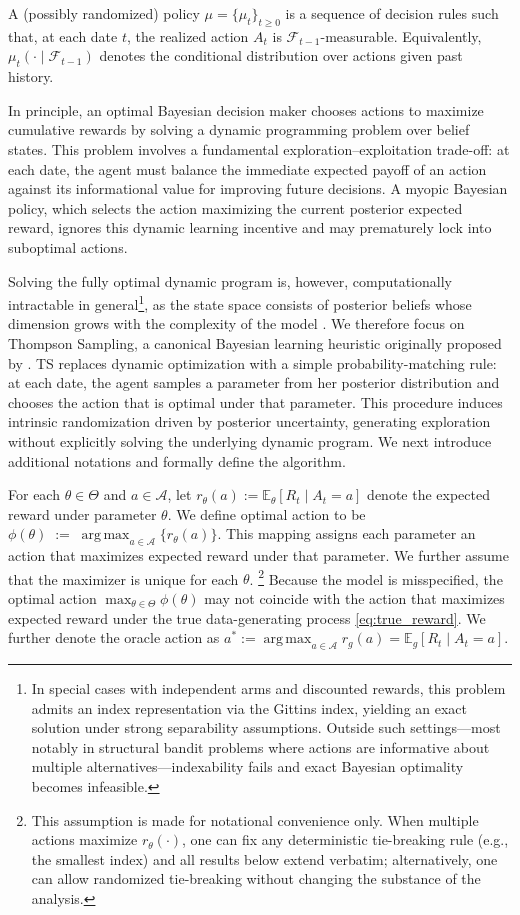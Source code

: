 \documentclass[12pt]{article}
\DeclareMathOperator*{\argmax}{arg\,max}
\begin{document}
A (possibly randomized) policy $\mu=\{\mu_t\}_{t\ge 0}$ is a sequence of decision rules such that, at each date $t$, the realized action $A_t$ is $\mathcal F_{t-1}$-measurable. Equivalently, $\mu_t(\cdot\mid\mathcal F_{t-1})$ denotes the conditional distribution over actions given past history. 

In principle, an optimal Bayesian decision maker chooses actions to maximize cumulative rewards by solving a dynamic programming problem over belief states. This problem involves a fundamental exploration–exploitation trade-off: at each date, the agent must balance the immediate expected payoff of an action against its informational value for improving future decisions. A myopic Bayesian policy, which selects the action maximizing the current posterior expected reward, ignores this dynamic learning incentive and may prematurely lock into suboptimal actions.

Solving the fully optimal dynamic program is, however, computationally intractable in general\footnote{In special cases with independent arms and discounted rewards, this problem admits an index representation via the Gittins index, yielding an exact solution under strong separability assumptions. Outside such settings—most notably in structural bandit problems where actions are informative about multiple alternatives—indexability fails and exact Bayesian optimality becomes infeasible.}, as the state space consists of posterior beliefs whose dimension grows with the complexity of the model \citep{lattimoreBanditAlgorithms2020}. We therefore focus on Thompson Sampling, a canonical Bayesian learning heuristic originally proposed by \citet{thompsonLikelihoodThatOne1933}. TS replaces dynamic optimization with a simple probability-matching rule: at each date, the agent samples a parameter from her posterior distribution and chooses the action that is optimal under that parameter. This procedure induces intrinsic randomization driven by posterior uncertainty, generating exploration without explicitly solving the underlying dynamic program. We next introduce additional notations and formally define the algorithm.

For each $\theta \in \Theta$ and $a \in \mathcal{A}$, let $
r_\theta(a) := \mathbb E_\theta[R_t \mid A_t = a]
$ denote the expected reward under parameter $\theta$. We define optimal action to be $\label{eq:optimal_action} \phi(\theta) \;:=\; \argmax_{a \in \mathcal{A}} \{ r_{\theta}(a) \}$. This mapping assigns each parameter an action that maximizes expected reward under that parameter. We further assume that the maximizer is unique for each $\theta$. \footnote{This assumption is made for notational convenience only. When multiple actions maximize $r_\theta(\cdot)$, one can fix any deterministic tie-breaking rule (e.g., the smallest index) and all results below extend verbatim; alternatively, one can allow randomized tie-breaking without changing the substance of the analysis.} Because the model is misspecified, the optimal action $\max_{\theta \in \Theta} \phi(\theta)$ may not coincide with the action that maximizes expected reward under the true data-generating process \eqref{eq:true_reward}. We further denote the oracle action as $a^* := \argmax_{a \in \mathcal{A}} r_g(a) = \mathbb E_g[R_t \mid A_t = a]$.
\end{document}

